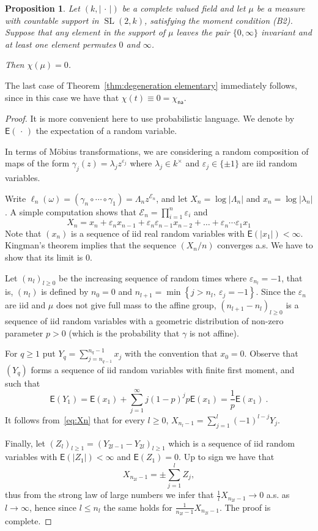 \documentclass[11pt]{article}
\newtheorem{prop}[theo]{Proposition}
\theoremstyle{definition}
\numberwithin{equation}{section}
\numberwithin{figure}{section}
\numberwithin{table}{section}
\DeclareMathOperator{\SL}{SL}
\newcommand{\sE}{\mathsf{E}}
\newcommand{\e}{\varepsilon}
\newcommand{\set}[1]{\left\{#1\right\}}
\newcommand{\abs}[1]{\left\vert#1\right\vert}
\newcommand{\unsur}[1]{\frac{1}{#1}}
\newcommand{\la}{\lambda}
\newcommand{\na}{\mathsf{na}}
\newcommand{\SLk}{\SL(2,k)}
\begin{document}
\begin{prop}\label{prop:formula 0infty}
Let $(k,\abs{{\,\cdot\,}})$ be a complete valued field and let $\mu$ be a measure with countable support in $\SLk$, satisfying the moment condition (B2). Suppose that any element in the support of $\mu$ leaves the pair $\{0,\infty\}$ invariant and at least one element permutes $0$ and $\infty$.

Then $\chi(\mu) = 0$.
\end{prop}

The last case of Theorem~\ref{thm:degeneration elementary} immediately follows, since in this case we have that $\chi(t) \equiv 0 = \chi_\na $.

\begin{proof}
It is more convenient here to use probabilistic language. We denote by $\sE({\,\cdot\,})$ the expectation of a random variable.

In terms of M\"obius transformations, we are considering a random composition of maps of the form $\gamma_j(z) = \la_j z^{\e_j}$ where $\lambda_j\in k^\times$ and $\e_j \in \{\pm1\}$ are iid random variables.

Write $\ell_n(\omega) = (\gamma_n \circ \cdots \circ \gamma_1) = \Lambda_n z^{\mathcal{E}_n}$, and let $X_n = \log |\Lambda_n|$ and $x_n = \log|\lambda_n|$. A simple computation shows that $\mathcal{E}_n = \prod_{i=1}^{n} \e_i$ and
\begin{equation}\label{eq:Xn}
X_n = x_n + \e_n x_{n-1} + \e_n \e_{n-1} x_{n-2} + \ldots + \e_n\cdots \e_1 x_1
\end{equation}
Note that $(x_n)$ is a sequence of iid real random variables with $\sE(\abs{x_1})<\infty$. Kingman's theorem implies that the sequence $(X_n/n)$ converges a.s. We have to show that its limit is 0.

Let $(n_l)_{l\ge0}$ be the increasing sequence of random times where $\e_{n_l} = -1$, that is, $(n_l)$ is defined by $n_0=0$ and $n_{l+1} = \min\set{j> n_l, \ \e_j = -1}$. Since the $\e_n$ are iid and $\mu$ does not give full mass to the affine group, $(n_{l+1} - n_l)_{l\geq 0}$ is a sequence of iid random variables with a geometric distribution of non-zero parameter $p>0$ (which is the probability that $\gamma$ is not affine).

For $q\geq 1$ put $Y_q = \sum_{j=n_{q-1}}^{n_{q}-1} x_j$ with the convention that $x_0=0$. Observe that $(Y_q)$ forms a sequence of iid random variables with finite first moment, and such that
\[
\sE({Y_1}) = \sE({x_1})+ \sum_{j=1}^{\infty} j(1-p)^j p \sE({x_1}) = \unsur{p} \sE({x_1})~.
\]
It follows from~\eqref{eq:Xn} that for every $l\geq 0$, $X_{n_l-1} = \sum_{j=1}^l (-1)^{l-j} Y_j$.

Finally, let $(Z_{l})_{l\geq 1} =(Y_{2l-1}-Y_{2l})_{l\geq 1} $ which is a sequence of iid random variables with $\sE(\abs{Z_1})<\infty$ and $\sE({Z_1})=0$. Up to sign we have that
\[
X_{n_{2l}-1} = \pm \sum_{j=1}^l Z_j,
\]
thus from the strong law of large numbers we infer that $\unsur{l} X_{n_{2l}-1} \to 0$ a.s. as $l\to \infty$, hence since $l\le n_l$ the same holds for $\unsur{n_{2l}-1} X_{n_{2l}-1}$. The proof is complete.
\end{proof}
\end{document}
